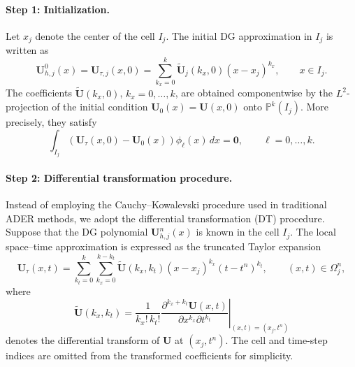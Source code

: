 \documentclass[11pt]{article}
\begin{document}
\paragraph{Step 1: Initialization.}

Let \(x_j\) denote the center of the cell \(I_j\). The initial DG
approximation in \(I_j\) is written as
\begin{equation}
    \mathbf{U}_{h,j}^{0}(x) = \mathbf{U}_{\tau,j}(x,0)
    =
    \sum_{k_x=0}^{k}
    \widetilde{\mathbf{U}}_j(k_x,0)
    (x-x_j)^{k_x},
    \qquad x\in I_j.
    \tag{9}
\end{equation}
The coefficients
\(\widetilde{\mathbf{U}}(k_x,0)\), \(k_x=0,\ldots,k\), are obtained
componentwise by the \(L^2\)-projection of the initial condition
\(\mathbf{U}_0(x)=\mathbf{U}(x,0)\) onto
\(\mathbb{P}^k(I_j)\). More precisely, they satisfy
\[
    \int_{I_j}
    \left(
        \mathbf{U}_{\tau}(x,0)-\mathbf{U}_0(x)
    \right)
    \phi_{\ell}(x)\,dx
    =
    \mathbf{0},
    \qquad \ell=0,\ldots,k.
\]

\paragraph{Step 2: Differential transformation procedure.}

Instead of employing the Cauchy--Kowalevski procedure used in
traditional ADER methods, we adopt the differential transformation
(DT) procedure. Suppose that the DG polynomial
\(\mathbf{U}_{h,j}^n(x)\) is known in the cell \(I_j\). The local
space--time approximation is expressed as the truncated Taylor
expansion
\begin{equation}
    \mathbf{U}_{\tau}(x,t)
    =
    \sum_{k_t=0}^{k}
    \sum_{k_x=0}^{k-k_t}
    \widetilde{\mathbf{U}}(k_x,k_t)
    (x-x_j)^{k_x}(t-t^n)^{k_t},
    \qquad (x,t)\in\Omega_j^n,
    \tag{10a}
\end{equation}
where
\begin{equation}
    \widetilde{\mathbf{U}}(k_x,k_t)
    =
    \frac{1}{k_x!\,k_t!}
    \left.
    \frac{\partial^{k_x+k_t}\mathbf{U}(x,t)}
         {\partial x^{k_x}\partial t^{k_t}}
    \right|_{(x,t)=(x_j,t^n)}
    \tag{10b}
\end{equation}
denotes the differential transform of \(\mathbf{U}\) at
\((x_j,t^n)\). The cell and time-step indices are omitted from the
transformed coefficients for simplicity.
\end{document}
